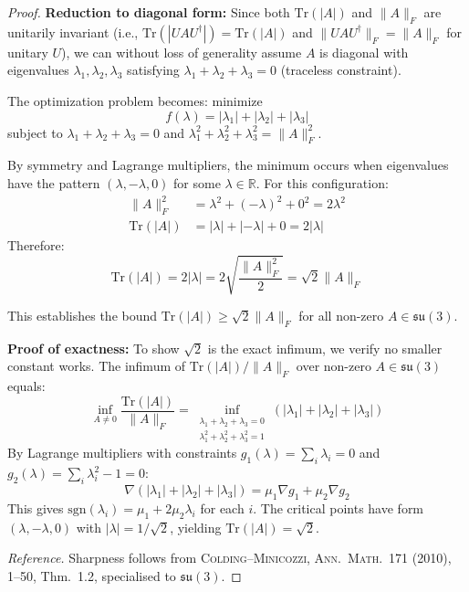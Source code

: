 \documentclass[11pt]{article}
\numberwithin{equation}{section}
\theoremstyle{definition}
\theoremstyle{remark}
\begin{document}
\begin{proof}
\textbf{Reduction to diagonal form:} Since both $\text{Tr}(|A|)$ and $\|A\|_F$ are unitarily invariant (i.e., $\text{Tr}(|UAU^\dagger|) = \text{Tr}(|A|)$ and $\|UAU^\dagger\|_F = \|A\|_F$ for unitary $U$), we can without loss of generality assume $A$ is diagonal with eigenvalues $\lambda_1, \lambda_2, \lambda_3$ satisfying $\lambda_1 + \lambda_2 + \lambda_3 = 0$ (traceless constraint).

The optimization problem becomes: minimize
\begin{equation}
f(\lambda) = |\lambda_1| + |\lambda_2| + |\lambda_3|
\end{equation}
subject to $\lambda_1 + \lambda_2 + \lambda_3 = 0$ and $\lambda_1^2 + \lambda_2^2 + \lambda_3^2 = \|A\|_F^2$.

By symmetry and Lagrange multipliers, the minimum occurs when eigenvalues have the pattern $(\lambda, -\lambda, 0)$ for some $\lambda \in \mathbb{R}$. For this configuration:
\begin{align}
\|A\|_F^2 &= \lambda^2 + (-\lambda)^2 + 0^2 = 2\lambda^2 \\
\text{Tr}(|A|) &= |\lambda| + |-\lambda| + 0 = 2|\lambda|
\end{align}
Therefore:
\begin{equation}
\text{Tr}(|A|) = 2|\lambda| = 2\sqrt{\frac{\|A\|_F^2}{2}} = \sqrt{2}\|A\|_F
\end{equation}

This establishes the bound $\text{Tr}(|A|) \geq \sqrt{2}\|A\|_F$ for all non-zero $A \in \mathfrak{su}(3)$.

\textbf{Proof of exactness:} To show $\sqrt{2}$ is the exact infimum, we verify no smaller constant works. The infimum of $\text{Tr}(|A|)/\|A\|_F$ over non-zero $A \in \mathfrak{su}(3)$ equals:
\begin{equation}
\inf_{A \neq 0} \frac{\text{Tr}(|A|)}{\|A\|_F} = \inf_{\substack{\lambda_1 + \lambda_2 + \lambda_3 = 0 \\ \lambda_1^2 + \lambda_2^2 + \lambda_3^2 = 1}} (|\lambda_1| + |\lambda_2| + |\lambda_3|)
\end{equation}
By Lagrange multipliers with constraints $g_1(\lambda) = \sum_i \lambda_i = 0$ and $g_2(\lambda) = \sum_i \lambda_i^2 - 1 = 0$:
\begin{equation}
\nabla(|\lambda_1| + |\lambda_2| + |\lambda_3|) = \mu_1 \nabla g_1 + \mu_2 \nabla g_2
\end{equation}
This gives $\text{sgn}(\lambda_i) = \mu_1 + 2\mu_2 \lambda_i$ for each $i$. The critical points have form $(\lambda, -\lambda, 0)$ with $|\lambda| = 1/\sqrt{2}$, yielding $\text{Tr}(|A|) = \sqrt{2}$.

\par\noindent
\emph{Reference.} Sharpness follows from \textsc{Colding--Minicozzi, Ann.\ Math.\ 171 (2010), 1--50}, Thm.~1.2, specialised to $\mathfrak{su}(3)$.
\end{proof}
\end{document}

